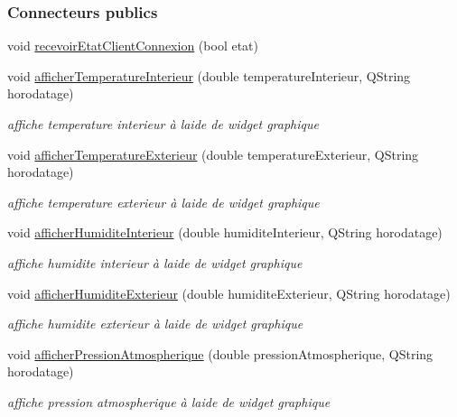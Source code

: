 \subsubsection*{Connecteurs publics}
\begin{DoxyCompactItemize}
\item 
void \hyperlink{class_ruche_ihm_a3a3dae9de8c51344aa6e3463db9e6ad9}{recevoir\+Etat\+Client\+Connexion} (bool etat)
\item 
void \hyperlink{class_ruche_ihm_a4b8483705f88b46e253ef73068cd8f2e}{afficher\+Temperature\+Interieur} (double temperature\+Interieur, Q\+String horodatage)
\begin{DoxyCompactList}\small\item\em affiche temperature interieur à l\textquotesingle{}aide de widget graphique \end{DoxyCompactList}\item 
void \hyperlink{class_ruche_ihm_a63e3a82b98678d00d57748e80fe5258b}{afficher\+Temperature\+Exterieur} (double temperature\+Exterieur, Q\+String horodatage)
\begin{DoxyCompactList}\small\item\em affiche temperature exterieur à l\textquotesingle{}aide de widget graphique \end{DoxyCompactList}\item 
void \hyperlink{class_ruche_ihm_a4ab4b1ba1618a9aaf5bdb7f51df987aa}{afficher\+Humidite\+Interieur} (double humidite\+Interieur, Q\+String horodatage)
\begin{DoxyCompactList}\small\item\em affiche humidite interieur à l\textquotesingle{}aide de widget graphique \end{DoxyCompactList}\item 
void \hyperlink{class_ruche_ihm_a6381018a7dc88cb966d7bbc49515495e}{afficher\+Humidite\+Exterieur} (double humidite\+Exterieur, Q\+String horodatage)
\begin{DoxyCompactList}\small\item\em affiche humidite exterieur à l\textquotesingle{}aide de widget graphique \end{DoxyCompactList}\item 
void \hyperlink{class_ruche_ihm_ab38e4be7a1f39c862d7d8ab2ed3de98e}{afficher\+Pression\+Atmospherique} (double pression\+Atmospherique, Q\+String horodatage)
\begin{DoxyCompactList}\small\item\em affiche pression atmospherique à l\textquotesingle{}aide de widget graphique \end{DoxyCompactList}\item 

\end{DoxyCompactItemize}
